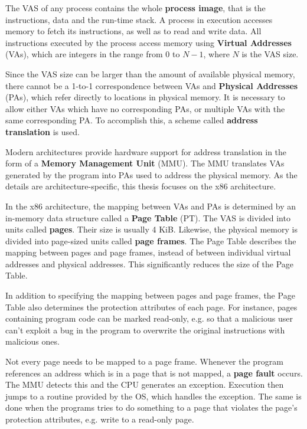 \documentclass[shortabstract, english]{iithesis}
\begin{document}
The VAS of any process contains the whole \textbf{process image}, that is the
instructions, data and the run-time stack. A process in execution accesses
memory to fetch its instructions, as well as to read and write data. All
instructions executed by the process access memory using \textbf{Virtual
  Addresses} (VAs), which are integers in the range from 0 to $N-1$, where $N$
is the VAS size.

Since the VAS size can be larger than the amount of available physical memory,
there cannot be a 1-to-1 correspondence between VAs and \textbf{Physical
  Addresses} (PAs), which refer directly to locations in physical memory. It is
necessary to allow either VAs which have no corresponding PAs, or multiple VAs
with the same corresponding PA. To accomplish this, a scheme called
\textbf{address translation} is used.

Modern architectures provide hardware support for address translation in the
form of a \textbf{Memory Management Unit} (MMU). The MMU translates VAs
generated by the program into PAs used to address the physical memory. As the
details are architecture-specific, this thesis focuses on the x86 architecture.

In the x86 architecture, the mapping between VAs and PAs is determined by an
in-memory data structure called a \textbf{Page Table} (PT). The VAS is divided
into units called \textbf{pages}. Their size is usually 4 KiB. Likewise, the
physical memory is divided into page-sized units called \textbf{page frames}.
The Page Table describes the mapping between pages and page frames, instead of
between individual virtual addresses and physical addresses. This significantly
reduces the size of the Page Table.

In addition to specifying the mapping between pages and page frames, the Page
Table also determines the protection attributes of each page. For instance,
pages containing program code can be marked read-only, e.g. so that a malicious
user can't exploit a bug in the program to overwrite the original instructions
with malicious ones.

Not every page needs to be mapped to a page frame. Whenever the program
references an address which is in a page that is not mapped, a \textbf{page
  fault} occurs. The MMU detects this and the CPU generates an exception.
Execution then jumps to a routine provided by the OS, which handles the
exception. The same is done when the programs tries to do something to a page
that violates the page's protection attributes, e.g. write to a read-only page.
\end{document}
